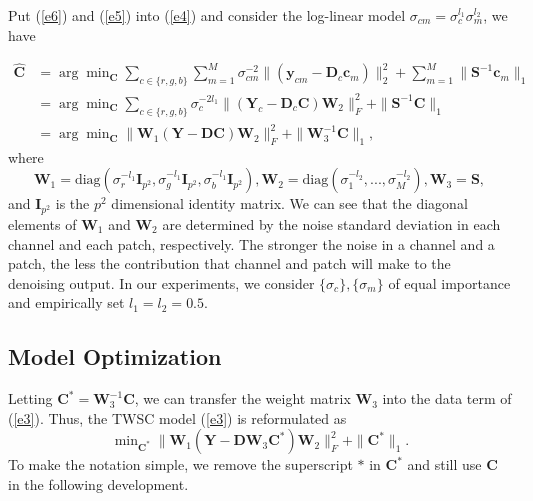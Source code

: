 Put (\ref{e6}) and (\ref{e5}) into (\ref{e4}) and consider the log-linear model $\sigma_{cm}=\sigma_{c}^{l_{1}}\sigma_{m}^{l_{2}}$, we have

\begin{equation}
\label{e7}
\begin{split}
\hat{\bm{C}}
&
=
\arg\min\nolimits_{\bm{C}}
\sum\nolimits_{c\in\{r, g, b\}}
\sum\nolimits_{m=1}^{M}
\sigma_{cm}^{-2}
\|(\bm{y}_{cm}-\bm{D}_{c}\bm{c}_{m})\|_{2}^{2}
+
\sum\nolimits_{m=1}^{M}
\|\bm{S}^{-1}\bm{c}_{m}\|_{1}
\\
&
=
\arg\min\nolimits_{\bm{C}}
\sum\nolimits_{c\in\{r, g, b\}}
\sigma_{c}^{-2l_{1}}
\|(\bm{Y}_{c}-\bm{D}_{c}\bm{C})\bm{W}_{2}\|_{F}^{2}+\|\bm{S}^{-1}\bm{C}\|_{1}
\\
&
=
\arg\min\nolimits_{\bm{C}}\|\bm{W}_{1}(\bm{Y}-\bm{D}\bm{C})\bm{W}_{2}\|_{F}^{2}+\|\bm{W}_{3}^{-1}\bm{C}\|_{1},
\end{split}
\end{equation}
where
\begin{equation}
\label{e8}
\bm{W}_{1}
=
\text{diag}(\sigma_{r}^{-l_{1}}\bm{I}_{p^2},\sigma_{g}^{-l_{1}}\bm{I}_{p^2},\sigma_{b}^{-l_{1}}\bm{I}_{p^2})
,
\bm{W}_{2}
=
\text{diag}(\sigma_{1}^{-l_{2}},...,\sigma_{M}^{-l_{2}})
,
\bm{W}_{3} 
= 
\bm{S}
,
\end{equation}
and $\bm{I}_{p^2}$ is the $p^{2}$ dimensional identity matrix. We can see that the diagonal elements of $\bm{W}_{1}$ and $\bm{W}_{2}$ are determined by the noise standard deviation in each channel and each patch, respectively. The stronger the noise in a channel and a patch, the less the contribution that channel and patch will make to the denoising output. In our experiments, we consider $\{\sigma_{c}\}, \{\sigma_{m}\}$ of equal importance and empirically set $l_{1}=l_{2}=0.5$.



\subsection{Model Optimization}

Letting $\bm{C}^{*}=\bm{W}_{3}^{-1}\bm{C}$, we can transfer the weight matrix $\bm{W}_{3}$ into the data term of (\ref{e3}). Thus, the TWSC model (\ref{e3}) is reformulated as 
\begin{equation}
\label{e9}
\min\nolimits_{\bm{C}^{*}}\|\bm{W}_{1}(\bm{Y}-\bm{D}\bm{W}_{3}\bm{C}^{*})\bm{W}_{2}\|_{F}^{2}
+
\|\bm{C}^{*}\|_{1}.
\end{equation}
To make the notation simple, we remove the superscript $*$ in $\bm{C}^{*}$ and still use $\bm{C}$ in the following development.

